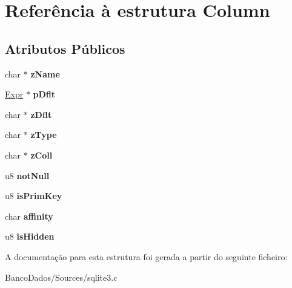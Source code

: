 \hypertarget{struct_column}{\section{Referência à estrutura Column}
\label{struct_column}
}
\subsection*{Atributos Públicos}
\begin{DoxyCompactItemize}
\item 
\hypertarget{struct_column_a6450a4e9fde68b3a2d79425d826eccc3}{char $\ast$ {\bfseries z\-Name}}\label{struct_column_a6450a4e9fde68b3a2d79425d826eccc3}

\item 
\hypertarget{struct_column_ac4178f302df70048235660979f84ffe4}{\hyperlink{struct_expr}{Expr} $\ast$ {\bfseries p\-Dflt}}\label{struct_column_ac4178f302df70048235660979f84ffe4}

\item 
\hypertarget{struct_column_a88d29c685783cddfbd039e5674990f4b}{char $\ast$ {\bfseries z\-Dflt}}\label{struct_column_a88d29c685783cddfbd039e5674990f4b}

\item 
\hypertarget{struct_column_aef09f43479c4bd2d07f77d340020f95f}{char $\ast$ {\bfseries z\-Type}}\label{struct_column_aef09f43479c4bd2d07f77d340020f95f}

\item 
\hypertarget{struct_column_aa95909d5c77b321258622ed28d7b96eb}{char $\ast$ {\bfseries z\-Coll}}\label{struct_column_aa95909d5c77b321258622ed28d7b96eb}

\item 
\hypertarget{struct_column_a852e9a4c1c327a64d9b051dcafda3841}{u8 {\bfseries not\-Null}}\label{struct_column_a852e9a4c1c327a64d9b051dcafda3841}

\item 
\hypertarget{struct_column_a57a53c2c60925a1ce5fdfe8fa3ccd62a}{u8 {\bfseries is\-Prim\-Key}}\label{struct_column_a57a53c2c60925a1ce5fdfe8fa3ccd62a}

\item 
\hypertarget{struct_column_ac9d6fe31c45888cecaf3f5ad5b93bf23}{char {\bfseries affinity}}\label{struct_column_ac9d6fe31c45888cecaf3f5ad5b93bf23}

\item 
\hypertarget{struct_column_aafdb39efd9b21476415c5beeb5a8b180}{u8 {\bfseries is\-Hidden}}\label{struct_column_aafdb39efd9b21476415c5beeb5a8b180}

\end{DoxyCompactItemize}


A documentação para esta estrutura foi gerada a partir do seguinte ficheiro\-:\begin{DoxyCompactItemize}
\item 
Banco\-Dados/\-Sources/sqlite3.\-c\end{DoxyCompactItemize}
